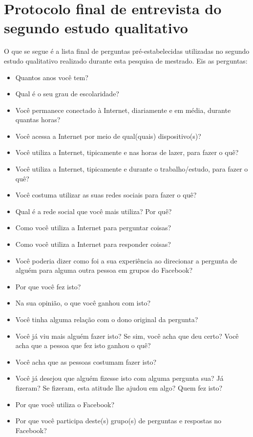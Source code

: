 \chapter{Protocolo final de entrevista do segundo estudo qualitativo}
O que se segue é a lista final de perguntas pré-estabelecidas utilizadas no segundo estudo qualitativo realizado durante esta pesquisa de mestrado. Eis as perguntas:
\begin{itemize}
\item Quantos anos você tem?
    \item Qual é o seu grau de escolaridade?
    \item Você permanece conectado à Internet, diariamente e em média, durante quantas horas?
    \item Você acessa a Internet por meio de qual(quais) dispositivo(s)?
    \item Você utiliza a Internet, tipicamente e nas horas de lazer, para fazer o quê?
    \item Você utiliza a Internet, tipicamente e durante o trabalho/estudo, para fazer o quê?
    \item Você costuma utilizar as suas redes sociais para fazer o quê?
    \item Qual é a rede social que você mais utiliza? Por quê?
    \item Como você utiliza a Internet para perguntar coisas? 
    \item Como você utiliza a Internet para responder coisas?
    \item Você poderia dizer como foi a sua experiência ao direcionar a pergunta de alguém para alguma outra pessoa em grupos do Facebook?
    \item Por que você fez isto?
    \item Na sua opinião, o que você ganhou com isto?
    \item Você tinha alguma relação com o dono original da pergunta?
    \item Você já viu mais alguém fazer isto? Se sim, você acha que deu certo? Você acha que a pessoa que fez isto ganhou o quê?
    \item Você acha que as pessoas costumam fazer isto?
    \item Você já desejou que alguém fizesse isto com alguma pergunta sua? Já fizeram? Se fizeram, esta atitude lhe ajudou em algo? Quem fez isto?
    \item Por que você utiliza o Facebook?
    \item Por que você participa deste(s) grupo(s) de perguntas e respostas no Facebook?
\end{itemize}